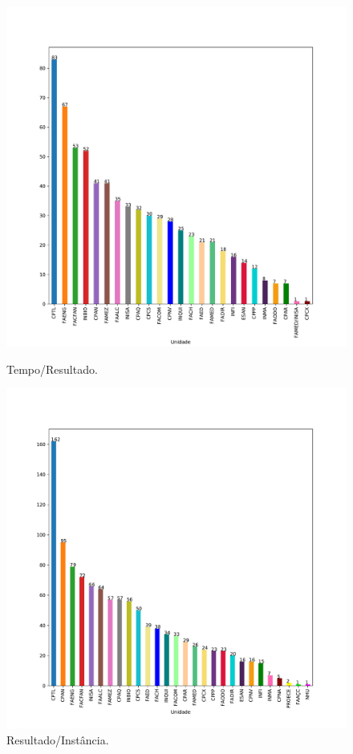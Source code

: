 \documentclass[a4paper, 12pt]{article}
\begin{document}
\begin{figure}[!htb]
    \centering
    \begin{minipage}{0.5\textwidth}
        \centering
        \includegraphics[width=1\textwidth]{../Resultados/img/unidade_bar_2018.pdf}
        \caption{Tempo/Resultado.}
        \label{fig:scatter_topDown}
    \end{minipage}%
    \begin{minipage}{0.5\textwidth}
        \centering
        \includegraphics[width=1\textwidth]{../Resultados/img/unidade_bar_2019.pdf}
        \caption{Resultado/Instância.}
        \label{fig:result_topDown}
    \end{minipage}
\end{figure}
\clearpage
\end{document}

